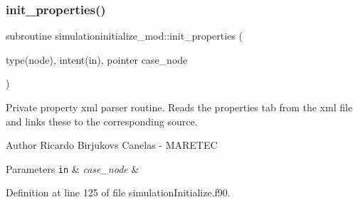 \subsubsection{\texorpdfstring{init\+\_\+properties()}{init\_properties()}}
{\footnotesize\ttfamily subroutine simulationinitialize\+\_\+mod\+::init\+\_\+properties (\begin{DoxyParamCaption}\item[{type(node), intent(in), pointer}]{case\+\_\+node }\end{DoxyParamCaption})\hspace{0.3cm}{\ttfamily [private]}}



Private property xml parser routine. Reads the properties tab from the xml file and links these to the corresponding source. 

\begin{DoxyAuthor}{Author}
Ricardo Birjukovs Canelas -\/ M\+A\+R\+E\+T\+EC 
\end{DoxyAuthor}

\begin{DoxyParams}[1]{Parameters}
\mbox{\tt in}  & {\em case\+\_\+node} & \\
\hline
\end{DoxyParams}


Definition at line 125 of file simulation\+Initialize.\+f90.


